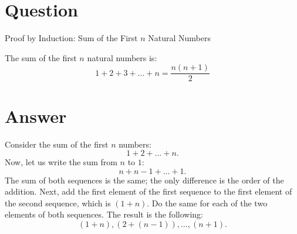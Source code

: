 \documentclass{article}
\begin{document}
\section{Question}
Proof by Induction: Sum of the First \( n \) Natural Numbers

The sum of the first \( n \) natural numbers is:
\[
    1 + 2 + 3 + \dots + n = \frac{n(n+1)}{2}
\]

\section{Answer}
Consider the sum of the first $n$ numbers:
\begin{equation}
    1+2+ \ldots + n.
\end{equation}
Now, let us write the sum from $n$ to $1$:
\begin{equation}
    n+n-1+ \ldots + 1.
\end{equation}
The sum of both sequences is the same; the only difference is the order of the addition. Next, add the first element of the first sequence to the first element of the second sequence, which is $(1+n)$. Do the same for each of the two elements of both sequences. The result is the following:
\begin{equation}
    (1+n), (2+(n-1)), \ldots, (n+1).
\end{equation}
\end{document}
